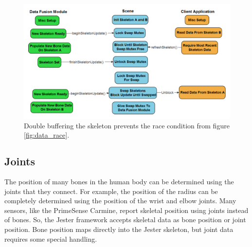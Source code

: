 \begin{figure}[]
\centering
\includegraphics[width=1\textwidth]{figures/doubleBuffer}
\caption{Double buffering the skeleton prevents the race condition from figure \ref{fig:data_race}.}
\label{fig:double_buffer}
\end{figure}

\subsection{Joints}

The position of many bones in the human body can be determined using the joints that they connect. For example, the position of the radius can be completely determined using the position of the wrist and elbow joints. Many sensors, like the PrimeSense Carmine, report skeletal position using joints instead of bones. So, the Jester framework accepts skeletal data as bone position or joint position. Bone position maps directly into the Jester skeleton, but joint data requires some special handling.

